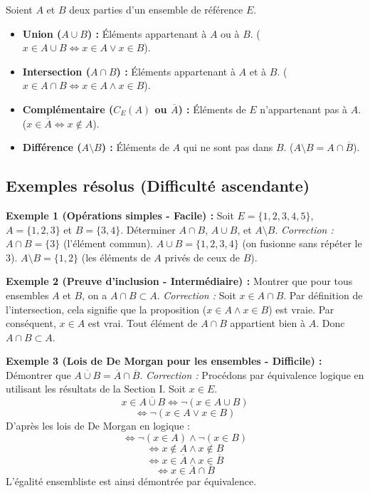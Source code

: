 \documentclass[12pt,a4paper]{report}
\begin{document}
Soient $A$ et $B$ deux parties d'un ensemble de référence $E$.
\begin{itemize}
    \item \textbf{Union ($A \cup B$) :} Éléments appartenant à $A$ ou à $B$. ($x \in A \cup B \iff x \in A \lor x \in B$).
    \item \textbf{Intersection ($A \cap B$) :} Éléments appartenant à $A$ et à $B$. ($x \in A \cap B \iff x \in A \land x \in B$).
    \item \textbf{Complémentaire ($C_E(A)$ ou $\overline{A}$) :} Éléments de $E$ n'appartenant pas à $A$. ($x \in \overline{A} \iff x \notin A$).
    \item \textbf{Différence ($A \setminus B$) :} Éléments de $A$ qui ne sont pas dans $B$. ($A \setminus B = A \cap \overline{B}$).
\end{itemize}

\subsection{Exemples résolus (Difficulté ascendante)}

\textbf{Exemple 1 (Opérations simples - Facile) :}
Soit $E = \{1, 2, 3, 4, 5\}$, $A = \{1, 2, 3\}$ et $B = \{3, 4\}$.
Déterminer $A \cap B$, $A \cup B$, et $A \setminus B$.
\textit{Correction :}
$A \cap B = \{3\}$ (l'élément commun).
$A \cup B = \{1, 2, 3, 4\}$ (on fusionne sans répéter le 3).
$A \setminus B = \{1, 2\}$ (les éléments de $A$ privés de ceux de $B$).

\textbf{Exemple 2 (Preuve d'inclusion - Intermédiaire) :}
Montrer que pour tous ensembles $A$ et $B$, on a $A \cap B \subset A$.
\textit{Correction :} Soit $x \in A \cap B$. Par définition de l'intersection, cela signifie que la proposition ($x \in A \land x \in B$) est vraie. Par conséquent, $x \in A$ est vrai. Tout élément de $A \cap B$ appartient bien à $A$. Donc $A \cap B \subset A$.

\textbf{Exemple 3 (Lois de De Morgan pour les ensembles - Difficile) :}
Démontrer que $\overline{A \cup B} = \overline{A} \cap \overline{B}$.
\textit{Correction :} Procédons par équivalence logique en utilisant les résultats de la Section I. Soit $x \in E$.
$$ x \in \overline{A \cup B} \iff \neg(x \in A \cup B) $$
$$ \iff \neg(x \in A \lor x \in B) $$
D'après les lois de De Morgan en logique :
$$ \iff \neg(x \in A) \land \neg(x \in B) $$
$$ \iff x \notin A \land x \notin B $$
$$ \iff x \in \overline{A} \land x \in \overline{B} $$
$$ \iff x \in \overline{A} \cap \overline{B} $$
L'égalité ensembliste est ainsi démontrée par équivalence.
\end{document}
